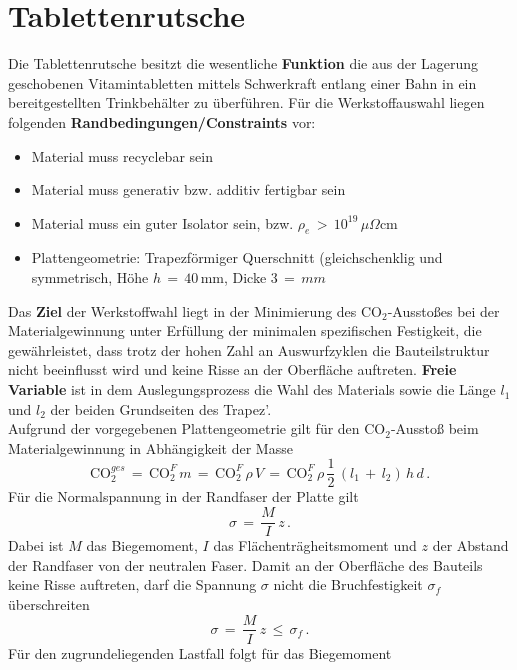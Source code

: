 \section{Tablettenrutsche}
Die Tablettenrutsche besitzt die wesentliche \textbf{Funktion} die aus der Lagerung geschobenen Vitamintabletten mittels Schwerkraft entlang einer Bahn in ein bereitgestellten Trinkbehälter zu überführen. Für die Werkstoffauswahl liegen folgenden \textbf{Randbedingungen/Constraints} vor:
\begin{itemize}
	\item Material muss recyclebar sein
	\item Material muss generativ bzw. additiv fertigbar sein
	\item Material muss ein guter Isolator sein, bzw. $\rho_e\,>\,10^{19}\,\mu\Omega$cm
	\item Plattengeometrie: Trapezförmiger Querschnitt (gleichschenklig und symmetrisch, Höhe $h\,=\,40\,$mm, Dicke $3\,=\,mm$
\end{itemize}
Das \textbf{Ziel} der Werkstoffwahl liegt in der Minimierung des CO$_2$-Ausstoßes bei der Materialgewinnung unter Erfüllung der minimalen spezifischen Festigkeit, die gewährleistet, dass trotz der hohen Zahl an Auswurfzyklen die Bauteilstruktur nicht beeinflusst wird und keine Risse an der Oberfläche auftreten. \textbf{Freie Variable} ist in dem Auslegungsprozess die Wahl des Materials sowie die Länge $l_1$ und $l_2$ der beiden Grundseiten des Trapez'.\\
Aufgrund der vorgegebenen Plattengeometrie gilt für den CO$_2$-Ausstoß beim Materialgewinnung in Abhängigkeit der Masse
\begin{equation}\label{masse32}
\text{CO}_2^{ges}\,=\,\text{CO}_2^F\,m\,=\,\text{CO}_2^F\,\rho\,V\,=\,\text{CO}_2^F\,\rho\,\frac{1}{2}\,(l_1\,+\,l_2)\,h\,d\,.
\end{equation}
Für die Normalspannung in der Randfaser der Platte gilt
\begin{equation}
\sigma\,=\,\frac{M}{I}\,z\,.
\end{equation}
Dabei ist $M$ das Biegemoment, $I$ das Flächenträgheitsmoment und $z$ der Abstand der Randfaser von der neutralen Faser. Damit an der Oberfläche des Bauteils keine Risse auftreten, darf die Spannung $\sigma$ nicht die Bruchfestigkeit $\sigma_f$ überschreiten
\begin{equation}\label{bruchfestigkeit32}
\sigma\,=\,\frac{M}{I}\,z\,\le\,\sigma_f\,.
\end{equation}
Für den zugrundeliegenden Lastfall folgt für das Biegemoment
